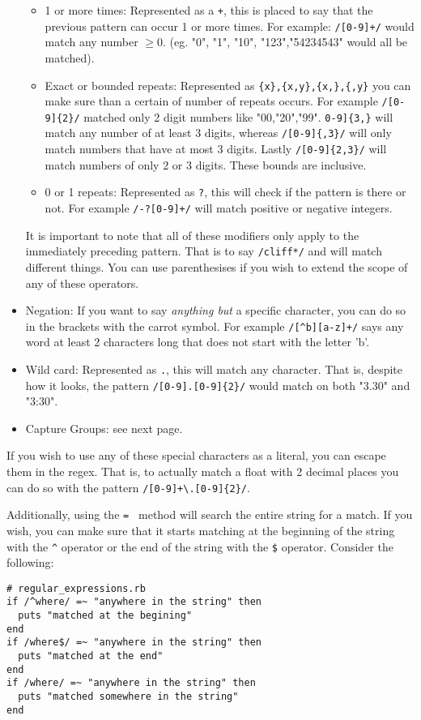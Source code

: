 \documentclass[main.tex]{subfiles}
\begin{document}
\begin{itemize}
\begin{itemize}
        \item 1 or more times: Represented as a \texttt{+}, this is placed to say that the previous pattern can occur 1 or more times. For example: \texttt{/[0-9]+/} would match any number $\ge 0$. (eg. "0", "1", "10", "123","54234543" would all be matched).  
        \item Exact or bounded repeats: Represented as \texttt{\{x\},\{x,y\},\{x,\},\{,y\}} you can make sure than a certain of number of repeats occurs. For example \texttt{/[0-9]\{2\}/} matched only 2 digit numbers like "00,"20","99". \texttt{0-9]\{3,\}} will match any number of at least 3 digits, whereas \texttt{/[0-9]\{,3\}/} will only match numbers that have at most 3 digits. Lastly \texttt{/[0-9]\{2,3\}/} will match numbers of only 2 or 3 digits. These bounds are inclusive.
        \item 0 or 1 repeats: Represented as \texttt{?}, this will check if the pattern is there or not. For example \texttt{/-?[0-9]+/} will match positive or negative integers. 
    \end{itemize}
    It is important to note that all of these modifiers only apply to the immediately preceding pattern. That is to say \texttt{/cliff*/} and  will match different things. You can use parenthesises if you wish to extend the scope of any of these operators. 
    \item Negation: If you want to say \textit{anything but} a specific character, you can do so in the brackets with the carrot symbol. For example \texttt{/[\string^b][a-z]+/} says any word at least 2 characters long that does not start with the letter 'b'. 
    \item Wild card: Represented as \texttt{.}, this will match any character. That is, despite how it looks, the pattern \texttt{/[0-9].[0-9]\{2\}/} would match on both "3.30" and "3:30". 
    \item Capture Groups: see next page.
\end{itemize}
If you wish to use any of these special characters as a literal, you can escape them in the regex. That is, to actually match a float with 2 decimal places you can do so with the pattern \texttt{/[0-9]+\textbackslash{}.[0-9]\{2\}/}. 

Additionally, using the \texttt{=~} method will search the entire string for a match. If you wish, you can make sure that it starts matching at the beginning of the string with the \texttt{\^} operator or the end of the string with the \texttt{\$} operator. Consider the following:
\begin{lstlisting}[style=MyRubyStyle]
# regular_expressions.rb
if /^where/ =~ "anywhere in the string" then
  puts "matched at the begining"
end
if /where$/ =~ "anywhere in the string" then
  puts "matched at the end"
end
if /where/ =~ "anywhere in the string" then
  puts "matched somewhere in the string"
end
\end{lstlisting}
\end{document}

